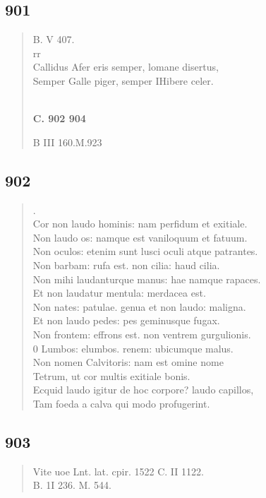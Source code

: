 \documentclass[11pt, a4paper]{report}
\begin{document}
            \subsection*{901}
      \begin{verse}
      B. V 407. \\ rr \\ Callidus Afer eris semper, lomane disertus, \\ Semper Galle piger, semper IHibere celer. \\ 
        ﻿\pagebreak 
     \marginpar{[341]} \begin{center} \textbf{C. 902 904} \end{center}B III 160.M.923 \\ 
      \end{verse}
  
            \subsection*{902}
      \begin{verse}
      . \\ Cor non laudo hominis: nam perfidum et exitiale. \\ Non laudo os: namque est vaniloquum et fatuum. \\ Non oculos: etenim sunt lusci oculi atque patrantes. \\ Non barbam: rufa est. non cilia: haud cilia. \\ Non mihi laudanturque manus: hae namque rapaces. \\ Et non laudatur mentula: merdacea est. \\ Non nates: patulae. genua et non laudo: maligna. \\ Et non laudo pedes: pes geminusque fugax. \\ Non frontem: effrons est. non ventrem gurgulionis. \\ 0 Lumbos: elumbos. renem: ubicumque malus. \\ Non nomen Calvitoris: nam est omine nome \\ Tetrum, ut cor multis exitiale bonis. \\ Ecquid laudo igitur de hoc corpore? laudo capillos, \\ Tam foeda a calva qui modo profugerint. \\ 
      \end{verse}
  
            \subsection*{903}
      \begin{verse}
      Vite uoe Lnt. lat. cpir. 1522 C. II 1122. \\ B. 1I 236. M. 544. \\ 
      \end{verse}
  
\end{document}
